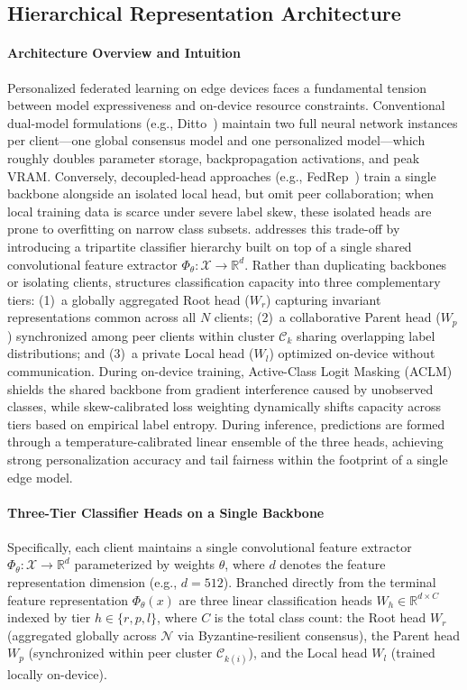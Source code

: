 \subsection{Hierarchical Representation Architecture}
\label{sec:architecture}

\paragraph{Architecture Overview and Intuition}
Personalized federated learning on edge devices faces a fundamental tension between model expressiveness and on-device resource constraints. Conventional dual-model formulations (e.g., Ditto~\cite{li2021ditto}) maintain two full neural network instances per client---one global consensus model and one personalized model---which roughly doubles parameter storage, backpropagation activations, and peak VRAM. Conversely, decoupled-head approaches (e.g., FedRep~\cite{collins2021exploiting}) train a single backbone alongside an isolated local head, but omit peer collaboration; when local training data is scarce under severe label skew, these isolated heads are prone to overfitting on narrow class subsets. \fedhep{} addresses this trade-off by introducing a tripartite classifier hierarchy built on top of a single shared convolutional feature extractor $\Phi_\theta: \mathcal{X} \to \mathbb{R}^d$. Rather than duplicating backbones or isolating clients, \fedhep{} structures classification capacity into three complementary tiers: (1)~a globally aggregated Root head ($W_r$) capturing invariant representations common across all $N$ clients; (2)~a collaborative Parent head ($W_p$) synchronized among peer clients within cluster $\mathcal{C}_k$ sharing overlapping label distributions; and (3)~a private Local head ($W_l$) optimized on-device without communication. During on-device training, Active-Class Logit Masking (ACLM) shields the shared backbone from gradient interference caused by unobserved classes, while skew-calibrated loss weighting dynamically shifts capacity across tiers based on empirical label entropy. During inference, predictions are formed through a temperature-calibrated linear ensemble of the three heads, achieving strong personalization accuracy and tail fairness within the footprint of a single edge model.

\paragraph{Three-Tier Classifier Heads on a Single Backbone}
Specifically, each client maintains a single convolutional feature extractor $\Phi_\theta: \mathcal{X} \to \mathbb{R}^d$ parameterized by weights $\theta$, where $d$ denotes the feature representation dimension (e.g., $d = 512$). Branched directly from the terminal feature representation $\Phi_\theta(x)$ are three linear classification heads $W_h \in \mathbb{R}^{d \times C}$ indexed by tier $h \in \{r, p, l\}$, where $C$ is the total class count: the Root head $W_r$ (aggregated globally across $\mathcal{N}$ via Byzantine-resilient consensus), the Parent head $W_p$ (synchronized within peer cluster $\mathcal{C}_{k(i)}$), and the Local head $W_l$ (trained locally on-device).

